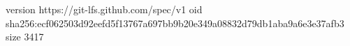 version https://git-lfs.github.com/spec/v1
oid sha256:ecf062503d92eefd5f13767a697bb9b20e349a08832d79db1aba9a6e3e37afb3
size 3417
